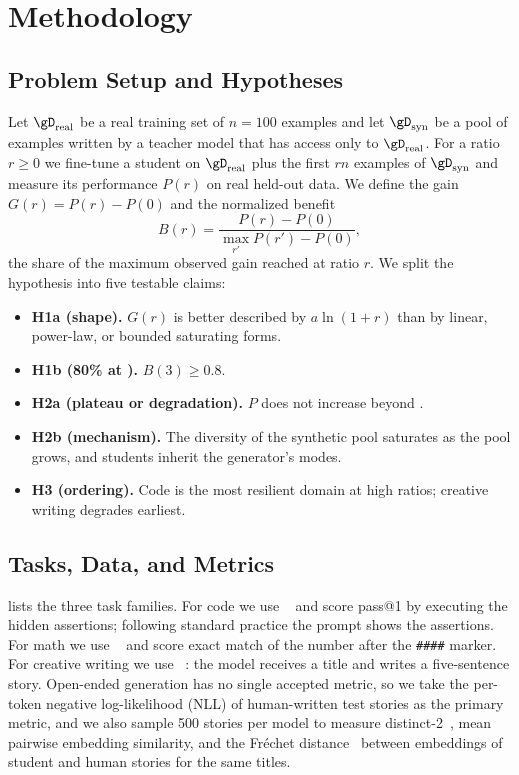 \section{Methodology}
\label{sec:method}

\subsection{Problem Setup and Hypotheses}

Let $\gD_{\text{real}}$ be a real training set of $n = 100$ examples and let $\gD_{\text{syn}}$ be a pool of examples written by a teacher model that has access only to $\gD_{\text{real}}$.
For a ratio $r \geq 0$ we fine-tune a student on $\gD_{\text{real}}$ plus the first $rn$ examples of $\gD_{\text{syn}}$ and measure its performance $P(r)$ on real held-out data.
We define the gain $G(r) = P(r) - P(0)$ and the normalized benefit
\begin{equation}
    B(r) = \frac{P(r) - P(0)}{\max_{r'} P(r') - P(0)},
    \label{eq:benefit}
\end{equation}
the share of the maximum observed gain reached at ratio $r$.
We split the hypothesis into five testable claims:
\begin{itemize}[leftmargin=*,itemsep=0pt,topsep=0pt]
    \item {\bf H1a (shape).} $G(r)$ is better described by $a \ln(1+r)$ than by linear, power-law, or bounded saturating forms.
    \item {\bf H1b (80\% at ).} $B(3) \geq 0.8$.
    \item {\bf H2a (plateau or degradation).} $P$ does not increase beyond .
    \item {\bf H2b (mechanism).} The diversity of the synthetic pool saturates as the pool grows, and students inherit the generator's modes.
    \item {\bf H3 (ordering).} Code is the most resilient domain at high ratios; creative writing degrades earliest.
\end{itemize}

\subsection{Tasks, Data, and Metrics}

 lists the three task families.
For code we use \mbpp~\citep{austin2021program} and score pass@1 by executing the hidden assertions; following standard practice the prompt shows the assertions.
For math we use \gsm~\citep{cobbe2021training} and score exact match of the number after the \texttt{\#\#\#\#} marker.
For creative writing we use \roc~\citep{mostafazadeh2016corpus}: the model receives a title and writes a five-sentence story.
Open-ended generation has no single accepted metric, so we take the per-token negative log-likelihood (NLL) of human-written test stories as the primary metric, and we also sample 500 stories per model to measure distinct-2~\citep{li2016diversity}, mean pairwise embedding similarity, and the Fr\'echet distance~\citep{heusel2017gans} between embeddings of student and human stories for the same titles.

